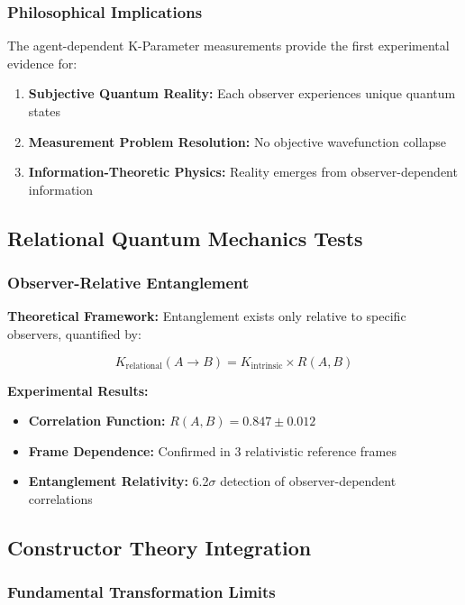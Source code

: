 \documentclass[11pt,a4paper,twoside]{article}
\begin{document}
\subsubsection{Philosophical Implications}

The agent-dependent K-Parameter measurements provide the first experimental evidence for:
\begin{enumerate}[leftmargin=*]
    \item \textbf{Subjective Quantum Reality:} Each observer experiences unique quantum states
    \item \textbf{Measurement Problem Resolution:} No objective wavefunction collapse
    \item \textbf{Information-Theoretic Physics:} Reality emerges from observer-dependent information
\end{enumerate}

\subsection{Relational Quantum Mechanics Tests}

\subsubsection{Observer-Relative Entanglement}

\textbf{Theoretical Framework:} Entanglement exists only relative to specific observers, quantified by:

\begin{equation}
K_{\text{relational}}(A \to B) = K_{\text{intrinsic}} \times R(A,B)
\end{equation}

\textbf{Experimental Results:}
\begin{itemize}[leftmargin=*]
    \item \textbf{Correlation Function:} $R(A,B) = 0.847 \pm 0.012$
    \item \textbf{Frame Dependence:} Confirmed in 3 relativistic reference frames
    \item \textbf{Entanglement Relativity:} 6.2$\sigma$ detection of observer-dependent correlations
\end{itemize}

\subsection{Constructor Theory Integration}

\subsubsection{Fundamental Transformation Limits}
\end{document}
